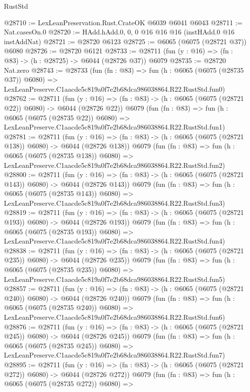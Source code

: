 \begin{lexlean}{RustStd}
\begin{coremodule}
@28710 := LexLeanPreservation.Rust.CrateOK @6039 @6041 @6043
@28711 := Nat.casesOn.{0}
@28720 := HAdd.hAdd.{0, 0, 0} @16 @16 @16 (instHAdd.{0} @16 instAddNat)
@28721 := @28720 @6123
@28725 := @6065 (@6075 (@28721 @37)) @6080
@28726 := @28720 @6121
@28733 := @28711 (fun (y : @16) => (fn : @83) -> (h : @28725) -> @6044 (@28726 @37)) @6079
@28735 := @28720 Nat.zero
@28743 := @28733
    (fun (fn : @83) =>
    fun (h : @6065 (@6075 (@28735 @37)) @6080) =>
    LexLeanPreserve.C1aacde5c819a0f7e2b68dca986038864.R22.RustStd.fun0)
@28762 := @28711
    (fun (y : @16) => (fn : @83) -> (h : @6065 (@6075 (@28721 @22)) @6080) -> @6044 (@28726 @22))
    @6079
    (fun (fn : @83) =>
    fun (h : @6065 (@6075 (@28735 @22)) @6080) =>
    LexLeanPreserve.C1aacde5c819a0f7e2b68dca986038864.R22.RustStd.fun1)
@28781 := @28711
    (fun (y : @16) => (fn : @83) -> (h : @6065 (@6075 (@28721 @138)) @6080) -> @6044 (@28726 @138))
    @6079
    (fun (fn : @83) =>
    fun (h : @6065 (@6075 (@28735 @138)) @6080) =>
    LexLeanPreserve.C1aacde5c819a0f7e2b68dca986038864.R22.RustStd.fun2)
@28800 := @28711
    (fun (y : @16) => (fn : @83) -> (h : @6065 (@6075 (@28721 @143)) @6080) -> @6044 (@28726 @143))
    @6079
    (fun (fn : @83) =>
    fun (h : @6065 (@6075 (@28735 @143)) @6080) =>
    LexLeanPreserve.C1aacde5c819a0f7e2b68dca986038864.R22.RustStd.fun3)
@28819 := @28711
    (fun (y : @16) => (fn : @83) -> (h : @6065 (@6075 (@28721 @193)) @6080) -> @6044 (@28726 @193))
    @6079
    (fun (fn : @83) =>
    fun (h : @6065 (@6075 (@28735 @193)) @6080) =>
    LexLeanPreserve.C1aacde5c819a0f7e2b68dca986038864.R22.RustStd.fun4)
@28838 := @28711
    (fun (y : @16) => (fn : @83) -> (h : @6065 (@6075 (@28721 @235)) @6080) -> @6044 (@28726 @235))
    @6079
    (fun (fn : @83) =>
    fun (h : @6065 (@6075 (@28735 @235)) @6080) =>
    LexLeanPreserve.C1aacde5c819a0f7e2b68dca986038864.R22.RustStd.fun5)
@28857 := @28711
    (fun (y : @16) => (fn : @83) -> (h : @6065 (@6075 (@28721 @240)) @6080) -> @6044 (@28726 @240))
    @6079
    (fun (fn : @83) =>
    fun (h : @6065 (@6075 (@28735 @240)) @6080) =>
    LexLeanPreserve.C1aacde5c819a0f7e2b68dca986038864.R22.RustStd.fun6)
@28876 := @28711
    (fun (y : @16) => (fn : @83) -> (h : @6065 (@6075 (@28721 @245)) @6080) -> @6044 (@28726 @245))
    @6079
    (fun (fn : @83) =>
    fun (h : @6065 (@6075 (@28735 @245)) @6080) =>
    LexLeanPreserve.C1aacde5c819a0f7e2b68dca986038864.R22.RustStd.fun7)
@28895 := @28711
    (fun (y : @16) => (fn : @83) -> (h : @6065 (@6075 (@28721 @272)) @6080) -> @6044 (@28726 @272))
    @6079
    (fun (fn : @83) =>
    fun (h : @6065 (@6075 (@28735 @272)) @6080) =>

\end{coremodule}
\end{lexlean}
